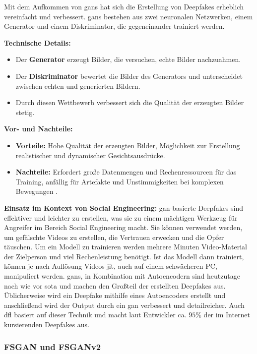 Mit dem Aufkommen von \glspl{gan} hat sich die Erstellung von Deepfakes erheblich vereinfacht und verbessert.
\glspl{gan} bestehen aus zwei neuronalen Netzwerken, einem Generator und einem Diskriminator, die gegeneinander trainiert werden.\cite{Deepfakes-a-survey-and-introduction-to-the-topical-collection}

\textbf{Technische Details:}
\begin{itemize}
    \item Der \textbf{Generator} erzeugt Bilder, die versuchen, echte Bilder nachzuahmen.
    \item Der \textbf{Diskriminator} bewertet die Bilder des Generators und unterscheidet zwischen echten und generierten Bildern.
    \item Durch diesen Wettbewerb verbessert sich die Qualität der erzeugten Bilder stetig.
\end{itemize}

\textbf{Vor- und Nachteile:}
\begin{itemize}
    \item \textbf{Vorteile:} Hohe Qualität der erzeugten Bilder, Möglichkeit zur Erstellung realistischer und dynamischer Gesichtsausdrücke.
    \item \textbf{Nachteile:} Erfordert große Datenmengen und Rechenressourcen für das Training, anfällig für Artefakte und Unstimmigkeiten bei komplexen Bewegungen \cite{Deepfakes-An-Overview}.
\end{itemize}

\textbf{Einsatz im Kontext von Social Engineering:} \gls{gan}-basierte Deepfakes sind effektiver und leichter zu erstellen, was sie zu einem mächtigen Werkzeug für Angreifer im Bereich Social Engineering macht.
Sie können verwendet werden, um gefälschte Videos zu erstellen, die Vertrauen erwecken und die Opfer täuschen.
Um ein Modell zu trainieren werden mehrere Minuten Video-Material der Zielperson und viel Rechenleistung benötigt.
Ist das Modell dann trainiert, können je nach Auflösung Videos \gls{jit}, auch auf einem schwächeren PC, manipuliert werden.
\glspl{gan}, in Kombination mit Autoencodern sind heutzutage nach wie vor \gls{sota} und machen den Großteil der erstellten Deepfakes aus.
Üblicherweise wird ein Deepfake mithilfe eines Autoencoders erstellt und anschließend wird der Output durch ein \gls{gan} verbessert und detailreicher.
Auch \gls{dfl} basiert auf dieser Technik und macht laut Entwickler ca. $95\%$ der im Internet kursierenden Deepfakes aus\cite{dfl-github-repo}.

\subsubsection{FSGAN und FSGANv2}\label{subsubsec:fsgan}

